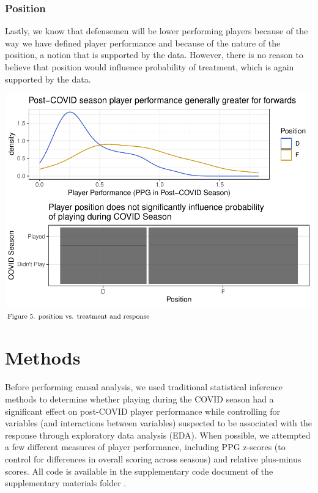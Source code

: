 \documentclass[12pt]{article}
\begin{document}
\hypertarget{position}{%
\subsubsection{Position}\label{position}}

Lastly, we know that defensemen will be lower performing players because
of the way we have defined player performance and because of the nature
of the position, a notion that is supported by the data. However, there
is no reason to believe that position would influence probability of
treatment, which is again supported by the data.

\includegraphics{journal-article_files/figure-latex/pos-plots-1.pdf}
\(\hspace*{\fill} \footnotesize \text{Figure 5. position vs. treatment and response}\)

\hypertarget{methods}{%
\section{Methods}\label{methods}}

Before performing causal analysis, we used traditional statistical
inference methods to determine whether playing during the COVID season
had a significant effect on post-COVID player performance while
controlling for variables (and interactions between variables) suspected
to be associated with the response through exploratory data analysis
(EDA). When possible, we attempted a few different measures of player
performance, including PPG z-scores (to control for differences in
overall scoring across seasons) and relative plus-minus scores. All code
is available in the supplementary code document of the supplementary
materials folder \citet{author}.
\end{document}
